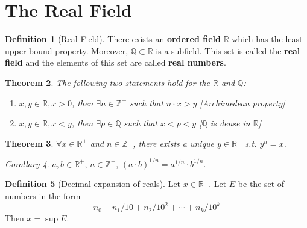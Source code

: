 \documentclass[a4paper,12pt]{report}
\newcommand{\Z}{\mathbb{Z}}
\newcommand{\Q}{\mathbb{Q}}
\newcommand{\R}{\mathbb{R}}
\newcommand{\tb}{\textbf}
\theoremstyle{plain}
\newtheorem{theorem}{\color{blue}Theorem}[chapter] %
\theoremstyle{definition}
\newtheorem{definition}[theorem]{\color{red}Definition} %
\theoremstyle{remark}
\newtheorem{corollary}[theorem]{\color{SkyBlue}Corollary} %
\begin{document}
\section{The Real Field}
\begin{definition}[Real Field]
There exists an \tb{ordered field} $\R$ which has the least upper bound property. Moreover, $\Q\subset\R$ is a subfield. This set is called the \tb{real field} and the elements of this set are called \tb{real numbers}.
\end{definition}
\begin{theorem}
The following two statements hold for the $\R$ and $\Q$:
\begin{enumerate}
\item $x,y\in\R,x>0$, then $\exists n\in\Z^+$ such that $n\cdot x>y$ [Archimedean property]
\item $x,y\in\R,x<y$, then $\exists p\in\Q$ such that $x<p<y$ [$\Q$ is dense in $\R$]
\end{enumerate}
\end{theorem}
\begin{theorem}
$\forall x\in\R^+$ and $n\in\Z^+$, there exists a unique $y\in\R^+$ s.t. $y^n=x$.
\end{theorem}
\begin{corollary}
$a,b\in\R^+$, $n\in\Z^+$, $(a\cdot b)^{1/n}=a^{1/n}\cdot b^{1/n}$.
\end{corollary}
\begin{definition}[Decimal expansion of reals]
Let $x\in\R^+$. Let $E$ be the set of numbers in the form
\[
n_0+n_1/10+n_2/10^2+\cdots+n_k/10^k
\]
Then $x=\sup E$.
\end{definition}
\end{document}
